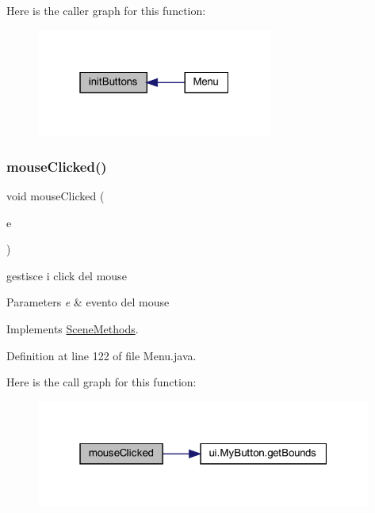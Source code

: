 Here is the caller graph for this function\+:\nopagebreak
\begin{figure}[H]
\begin{center}
\leavevmode
\includegraphics[width=220pt]{classscenes_1_1_menu_a27d3ba5afb772cc36c9a432c28975ace_icgraph}
\end{center}
\end{figure}
\mbox{\label{classscenes_1_1_menu_a45d56bd84238e8b56589dfc732e2b2cf}} 
\subsubsection{\texorpdfstring{mouse\+Clicked()}{mouseClicked()}}
{\footnotesize\ttfamily void mouse\+Clicked (\begin{DoxyParamCaption}\item[{Mouse\+Event}]{e }\end{DoxyParamCaption})}



gestisce i click del mouse 


\begin{DoxyParams}{Parameters}
{\em e} & evento del mouse \\
\hline
\end{DoxyParams}


Implements \hyperlink{interfacescenes_1_1_scene_methods_a45d56bd84238e8b56589dfc732e2b2cf}{Scene\+Methods}.



Definition at line 122 of file Menu.\+java.

Here is the call graph for this function\+:\nopagebreak
\begin{figure}[H]
\begin{center}
\leavevmode
\includegraphics[width=313pt]{classscenes_1_1_menu_a45d56bd84238e8b56589dfc732e2b2cf_cgraph}
\end{center}
\end{figure}
\mbox{\label{classscenes_1_1_menu_adbfc0588c017133c9b7070474402b72f}} 
